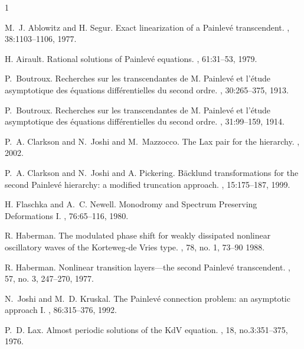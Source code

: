 \documentclass{amsart}
\theoremstyle{definition}
\theoremstyle{remark}
\theoremstyle{remark}
\begin{document}
%
\begin{thebibliography}{1}

M.~J. Ablowitz and H. Segur.
\newblock Exact linearization of a Painlev\'e transcendent.
, 38:1103--1106, 1977.

H. Airault.
\newblock Rational solutions of Painlev\'e equations.
, 61:31--53, 1979.

P.~Boutroux.
\newblock Recherches sur les transcendantes de {M. Painlev\'e} et l'\'etude
  asymptotique des \'equations diff\'erentielles du second ordre.
, 30:265--375, 1913.

P.~Boutroux.
\newblock Recherches sur les transcendantes de {M. Painlev\'e} et l'\'etude
  asymptotique des \'equations diff\'erentielles du second ordre.
, 31:99--159, 1914.

P.~A. Clarkson and N.~Joshi and M.~Mazzocco.
\newblock The Lax pair for the  hierarchy.
, 2002.


P.~A. Clarkson and N.~Joshi and A. Pickering.
\newblock B\"acklund transformations for the second {Painlev\'e}
hierarchy: a modified truncation approach.
, 15:175--187, 1999.




H. Flaschka and A.~C. Newell.
\newblock Monodromy and Spectrum Preserving Deformations I.
, 76:65--116, 1980.

R. Haberman.
\newblock The modulated phase shift for weakly dissipated nonlinear
oscillatory waves of the Korteweg-de Vries type.
, 78,  no. 1, 73--90 1988.


R. Haberman.
\newblock Nonlinear transition layers---the second Painlev\'e
transcendent.
, 57, no. 3, 247--270, 1977.


N.~Joshi and M.~D. Kruskal.
\newblock The {Painlev\'e} connection problem: an asymptotic approach {I}.
, 86:315--376, 1992.

P.~D. Lax.
\newblock Almost periodic solutions of the KdV equation.
, 18, no.3:351--375, 1976.


\end{thebibliography}
\end{document}

